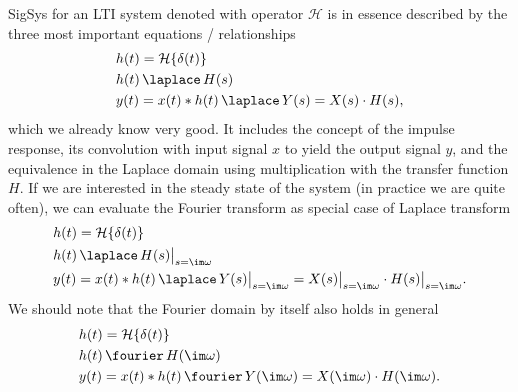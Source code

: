 \begin{mdframed}
SigSys for an LTI system denoted with operator $\mathcal{H}$ is in essence described
by the three most important equations / relationships
\begin{align}
&h(t) = \mathcal{H}\{\delta(t)\}\\
&h(t) \,\laplace\, H(s)\\
&y(t) = x(t) \ast h(t) \,\laplace\, Y(s) = X(s) \cdot H(s),
\end{align}
which we already know very good.
%
It includes the concept of the impulse response, its convolution with input
signal $x$ to yield the output signal $y$, and the equivalence in the Laplace
domain using multiplication with the transfer function $H$.
If we are interested in the steady state of the system (in practice we are quite often),
we can evaluate the Fourier transform as special case of Laplace transform
\begin{align}
&h(t) = \mathcal{H}\{\delta(t)\}\\
&h(t) \,\laplace\, H(s)\big|_{s=\im\omega}\\
&y(t) = x(t) \ast h(t) \,\laplace\, Y(s)\big|_{s=\im\omega} = X(s)\big|_{s=\im\omega} \cdot H(s)\big|_{s=\im\omega}.
\end{align}
%
We should note that the Fourier domain by itself also holds in general
\begin{align}
&h(t) = \mathcal{H}\{\delta(t)\}\\
&h(t) \,\fourier\, H(\im\omega)\\
&y(t) = x(t) \ast h(t) \,\fourier\, Y(\im\omega) = X(\im\omega) \cdot H(\im\omega).
\end{align}
\end{mdframed}

\clearpage

